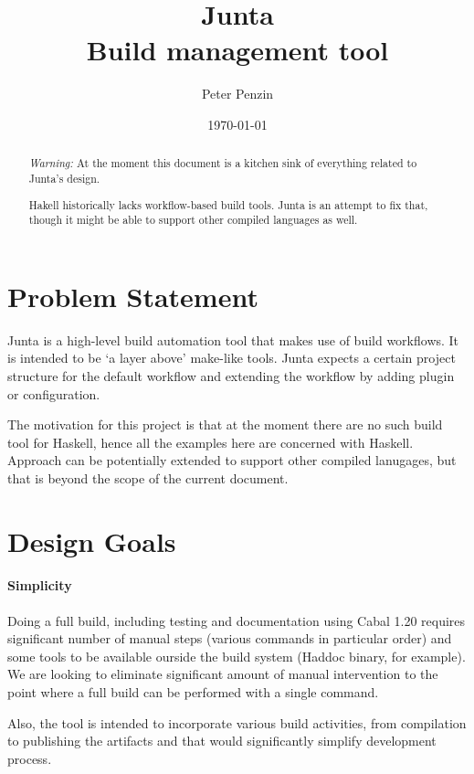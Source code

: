 \documentclass[11pt]{article}
\title{Junta\\Build management tool}
\author{Peter Penzin}
\date{\today}
\begin{document}
\maketitle

\begin{abstract}

\textit{Warning:} At the moment this document is a kitchen sink of everything
related to Junta's design. 

Hakell historically lacks workflow-based build tools. Junta is an attempt to
fix that, though it might be able to support other compiled languages as well.

\end{abstract}

\section{Problem Statement}
Junta is a high-level build automation tool that makes use of build workflows.
It is intended to be `a layer above' make-like tools. Junta expects a certain
project structure for the default workflow and extending the workflow by adding
plugin or configuration.

The motivation for this project is that at the moment there are no such build
tool for Haskell, hence all the examples here are concerned with Haskell.
Approach can be potentially extended to support other compiled lanugages, but
that is beyond the scope of the current document.

\section{Design Goals}

\paragraph{Simplicity}
Doing a full build, including testing and documentation using Cabal 1.20
requires significant number of manual steps (various commands in particular
order) and some tools to be available ourside the build system (Haddoc binary,
for example). We are looking to eliminate significant amount of manual
intervention to the point where a full build can be performed with a single
command.

Also, the tool is intended to incorporate various build activities, from
compilation to publishing the artifacts and that would significantly simplify
development process.
\end{document}
